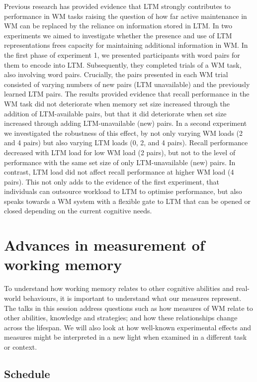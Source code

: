 \documentclass[12pt,]{book}
\begin{document}
Previous research has provided evidence that LTM strongly contributes to performance in WM tasks raising the question of how far active maintenance in WM can be replaced by the reliance on information stored in LTM. In two experiments we aimed to investigate whether the presence and use of LTM representations frees capacity for maintaining additional information in WM. In the first phase of experiment 1, we presented participants with word pairs for them to encode into LTM. Subsequently, they completed trials of a WM task, also involving word pairs. Crucially, the pairs presented in each WM trial consisted of varying numbers of new pairs (LTM unavailable) and the previously learned LTM pairs. The results provided evidence that recall performance in the WM task did not deteriorate when memory set size increased through the addition of LTM-available pairs, but that it did deteriorate when set size increased through adding LTM-unavailable (new) pairs. In a second experiment we investigated the robustness of this effect, by not only varying WM loads (2 and 4 pairs) but also varying LTM loads (0, 2, and 4 pairs). Recall performance decreased with LTM load for low WM load (2 pairs), but not to the level of performance with the same set size of only LTM-unavailable (new) pairs. In contrast, LTM load did not affect recall performance at higher WM load (4 pairs). This not only adds to the evidence of the first experiment, that individuals can outsource workload to LTM to optimise performance, but also speaks towards a WM system with a flexible gate to LTM that can be opened or closed depending on the current cognitive needs.

\hypertarget{advances-in-measurement-of-working-memory}{%
\chapter{Advances in measurement of working memory}\label{advances-in-measurement-of-working-memory}}

To understand how working memory relates to other cognitive abilities and real-world behaviours, it is important to understand what our measures represent. The talks in this session address questions such as how measures of WM relate to other abilities, knowledge and strategies; and how these relationships change across the lifespan. We will also look at how well-known experimental effects and measures might be interpreted in a new light when examined in a different task or context.

\hypertarget{schedule-4}{%
\section{Schedule}\label{schedule-4}}
\end{document}
